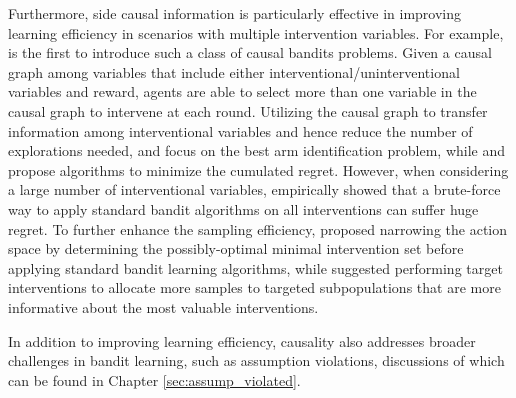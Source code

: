 Furthermore, side causal information is particularly effective in improving learning efficiency in scenarios with multiple intervention variables. For example, \citet{lattimore2016causal} is the first to introduce such a class of causal bandits problems. Given a causal graph among variables that include either interventional/uninterventional variables and reward, agents are able to select more than one variable in the causal graph to intervene at each round. Utilizing the causal graph to transfer information among interventional variables and hence reduce the number of explorations needed, \citet{lattimore2016causal} and \citet{sen2017identifying} focus on the best arm identification problem, while \citet{lu2020regret} and \citet{nair2021budgeted} propose algorithms to minimize the cumulated regret. However, when considering a large number of interventional variables, \citet{lee2018structural} empirically showed that a brute-force way to apply standard bandit algorithms on all interventions can suffer huge regret. To further enhance the sampling efficiency, \citet{lee2018structural, lee2019structural} proposed narrowing the action space by determining the possibly-optimal minimal intervention set before applying standard bandit learning algorithms, while \citet{subramanian2021causal} suggested performing target interventions to allocate more samples to targeted subpopulations that are more informative about the most valuable interventions.

In addition to improving learning efficiency, causality also addresses broader challenges in bandit learning, such as assumption violations, discussions of which can be found in Chapter \ref{sec:assump_violated}.


